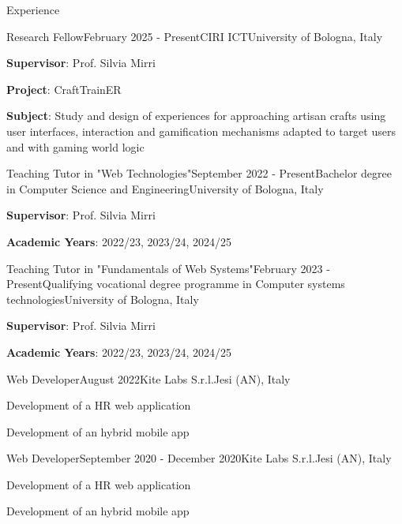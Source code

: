 \documentclass[
	11pt, %
]{resume} %
\begin{document}
\begin{rSection}{Experience}

    \begin{rSubsection}{Research Fellow}{February 2025 - Present}{CIRI ICT}{University of Bologna, Italy}
        \item \textbf{Supervisor}: Prof. Silvia Mirri
        \item \textbf{Project}: CraftTrainER
        \item \textbf{Subject}: Study and design of experiences for approaching artisan crafts using user interfaces, 
        interaction and gamification mechanisms adapted to target users and with gaming world logic
    \end{rSubsection}
    
    \begin{rSubsection}{Teaching Tutor in "Web Technologies"}{September 2022 - Present}{Bachelor degree in Computer Science and Engineering}{University of Bologna, Italy}
        \item \textbf{Supervisor}: Prof. Silvia Mirri
        \item \textbf{Academic Years}: 2022/23, 2023/24, 2024/25
    \end{rSubsection}

    \begin{rSubsection}{Teaching Tutor in "Fundamentals of Web Systems"}{February 2023 - Present}{Qualifying vocational degree programme in Computer systems technologies}{University of Bologna, Italy}
        \item \textbf{Supervisor}: Prof. Silvia Mirri
        \item \textbf{Academic Years}: 2022/23, 2023/24, 2024/25
    \end{rSubsection}

    \begin{rSubsection}{Web Developer}{August 2022}{Kite Labs S.r.l.}{Jesi (AN), Italy}
	    \item Development of a HR web application
        \item Development of an hybrid mobile app
    \end{rSubsection}

    \begin{rSubsection}{Web Developer}{September 2020 - December 2020}{Kite Labs S.r.l.}{Jesi (AN), Italy}
	    \item Development of a HR web application
        \item Development of an hybrid mobile app
    \end{rSubsection}


\end{rSection}
\end{document}
